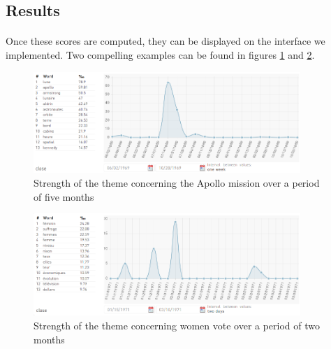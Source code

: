 \subsection{Results}
\paragraph{}
Once these scores are computed, they can be displayed on the interface we implemented. Two compelling examples can be found in figures \ref{fig:resStrength1} and \ref{fig:resStrength2}.

\begin{figure}[H]
\centering
\includegraphics[width=0.9\textwidth]{images/apollo}
\caption{Strength of the theme concerning the Apollo mission over a period of five months}
\label{fig:resStrength1}
\end{figure}

\begin{figure}[H]
\centering
\includegraphics[width=0.9\textwidth]{images/voteFemmes}
\caption{Strength of the theme concerning women vote over a period of two months}
\label{fig:resStrength2}
\end{figure}
